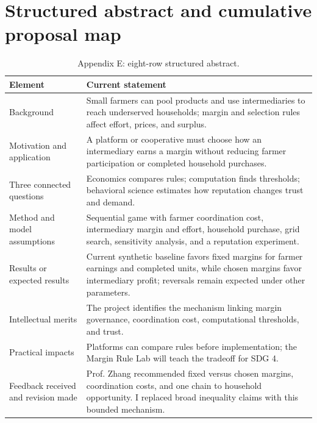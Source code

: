 \section{Structured abstract and cumulative proposal map}\label{app:abstract}
\begin{table}[H]\caption{Appendix E: eight-row structured abstract.}\renewcommand{\arraystretch}{1.15}\begin{tabularx}{\textwidth}{@{}p{}Y@{}}\toprule\textbf{Element}&\textbf{Current statement}\\\midrule
Background&Small farmers can pool products and use intermediaries to reach underserved households; margin and selection rules affect effort, prices, and surplus.\\
Motivation and application&A platform or cooperative must choose how an intermediary earns a margin without reducing farmer participation or completed household purchases.\\
Three connected questions&Economics compares rules; computation finds thresholds; behavioral science estimates how reputation changes trust and demand.\\
Method and model assumptions&Sequential game with farmer coordination cost, intermediary margin and effort, household purchase, grid search, sensitivity analysis, and a reputation experiment.\\
Results or expected results&Current synthetic baseline favors fixed margins for farmer earnings and completed units, while chosen margins favor intermediary profit; reversals remain expected under other parameters.\\
Intellectual merits&The project identifies the mechanism linking margin governance, coordination cost, computational thresholds, and trust.\\
Practical impacts&Platforms can compare rules before implementation; the Margin Rule Lab will teach the tradeoff for SDG 4.\\
Feedback received and revision made&Prof. Zhang recommended fixed versus chosen margins, coordination costs, and one chain to household opportunity. I replaced broad inequality claims with this bounded mechanism.\\\bottomrule\end{tabularx}\end{table}
